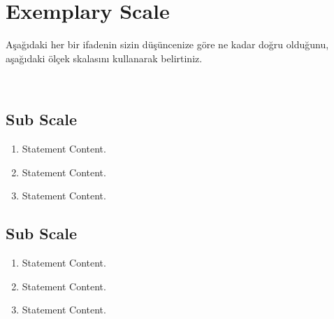 \chapter {Exemplary Scale}
\label {chp:appendixD}
Aşağıdaki her bir ifadenin sizin düşüncenize göre ne kadar doğru olduğunu, aşağıdaki ölçek skalasını kullanarak belirtiniz.\\

\hspace{2.5cm} \par
\hspace{1cm} \\


\section*{Sub Scale}
\begin{enumerate}
\item Statement Content.
\item Statement Content.
\item Statement Content.
\end{enumerate}

\section*{Sub Scale}
\begin{enumerate}
\item  Statement Content.
\item  Statement Content.
\item  Statement Content.
\end{enumerate}

